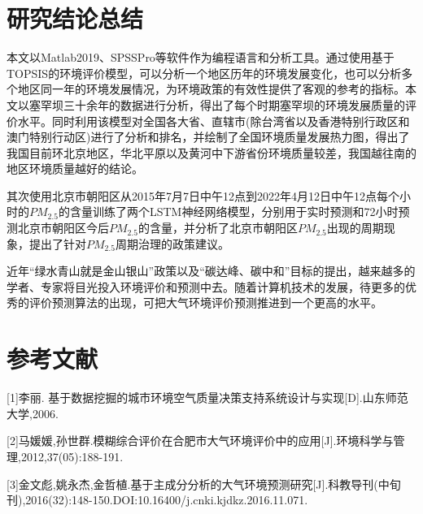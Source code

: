 \documentclass[UTF8]{ctexart}
\begin{document}
\newpage
\section{研究结论总结}
本文以Matlab2019、SPSSPro等软件作为编程语言和分析工具。通过使用基于TOPSIS的环境评价模型，可以分析一个地区历年的环境发展变化，也可以分析多个地区同一年的环境发展情况，为环境政策的有效性提供了客观的参考的指标。本文以塞罕坝三十余年的数据进行分析，得出了每个时期塞罕坝的环境发展质量的评价水平。同时利用该模型对全国各大省、直辖市(除台湾省以及香港特别行政区和澳门特别行动区)进行了分析和排名，并绘制了全国环境质量发展热力图，得出了我国目前环北京地区，华北平原以及黄河中下游省份环境质量较差，我国越往南的地区环境质量越好的结论。

其次使用北京市朝阳区从2015年7月7日中午12点到2022年4月12日中午12点每个小时的$PM_{2.5}$的含量训练了两个LSTM神经网络模型，分别用于实时预测和72小时预测北京市朝阳区今后$PM_{2.5}$的含量，并分析了北京市朝阳区$PM_{2.5}$出现的周期现象，提出了针对$PM_{2.5}$周期治理的政策建议。



近年“绿水青山就是金山银山”政策以及“碳达峰、碳中和”目标的提出，越来越多的学者、专家将目光投入环境评价和预测中去。随着计算机技术的发展，待更多的优秀的评价预测算法的出现，可把大气环境评价预测推进到一个更高的水平。

\newpage
\section{参考文献}
[1]李丽. 基于数据挖掘的城市环境空气质量决策支持系统设计与实现[D].山东师范大学,2006.

[2]马媛媛,孙世群.模糊综合评价在合肥市大气环境评价中的应用[J].环境科学与管理,2012,37(05):188-191.

[3]金文彪,姚永杰,金哲植.基于主成分分析的大气环境预测研究[J].科教导刊(中旬刊),2016(32):148-150.DOI:10.16400/j.cnki.kjdkz.2016.11.071.
\end{document}

